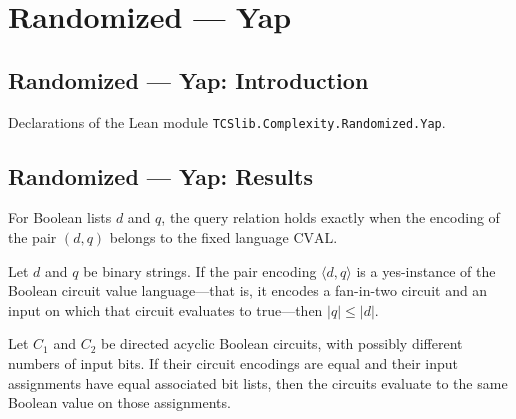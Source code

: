 \section{Randomized --- Yap}
\subsection*{Randomized --- Yap: Introduction}

Declarations of the Lean module \texttt{TCSlib.Complexity.Randomized.Yap}.

\subsection*{Randomized --- Yap: Results}

\begin{definition}
\label{Complexity.Yap.Query}
\leanok
{}
For Boolean lists $d$ and $q$, the query relation holds exactly when the encoding of the
pair $(d,q)$ belongs to the fixed language $\mathrm{CVAL}$.
\end{definition}

\begin{theorem}
\label{Complexity.Yap.length_le_of_query}
\leanok
{}
Let $d$ and $q$ be binary strings. If the pair encoding $\langle d,q\rangle$ is a
yes-instance of the Boolean circuit value language—that is, it encodes a fan-in-two
circuit and an input on which that circuit evaluates to true—then $|q|\le |d|$.
\end{theorem}

\begin{theorem}
\label{Complexity.Yap.eval_eq_of_encode_eq}
\leanok
{}
Let $C_1$ and $C_2$ be directed acyclic Boolean circuits, with possibly different
numbers of input bits. If their circuit encodings are equal and their input assignments
have equal associated bit lists, then the circuits evaluate to the same Boolean value on
those assignments.
\end{theorem}

